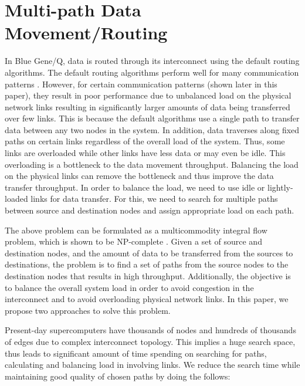 \section{Multi-path Data Movement/Routing}
\label{sec:approach}


In Blue Gene/Q, data is routed through its interconnect using the default routing algorithms. The default routing algorithms perform well for many communication patterns \cite{Chen:BGQ}. However, for certain communication patterns (shown later in this paper), they result in poor performance due to unbalanced load on the physical network links resulting in significantly larger amounts of data being transferred over few links. This is because the default algorithms use a single path to transfer data between any two nodes in the system. In addition, data traverses along fixed paths on certain links regardless of the overall load of the system. Thus, some links are overloaded while other links have less data or may even be idle. This overloading is a bottleneck to the data movement throughput. Balancing the load on the physical links can remove the bottleneck and thus improve the data transfer throughput. In order to balance the load, we need to use idle or lightly-loaded links for data transfer. For this, we need to search for multiple paths between source and destination nodes and assign appropriate load on each path.

The above problem can be formulated as a multicommodity integral flow problem, which is shown to be NP-complete \cite{even1975}. Given a set of source and destination nodes, and the amount of data to be transferred from the sources to destinations, the problem is to find a set of paths from the source nodes to the destination nodes that results in high throughput. Additionally, the objective is to balance the overall system load in order to avoid congestion in the interconnect and to avoid overloading physical network links. In this paper, we propose two approaches to solve this problem.

Present-day supercomputers have thousands of nodes and hundreds of thousands of edges due to complex interconnect topology. This implies a huge search space, thus leads to significant amount of time spending on searching for paths, calculating and balancing load in involving links. We reduce the search time while maintaining good quality of chosen paths by doing the follows:

